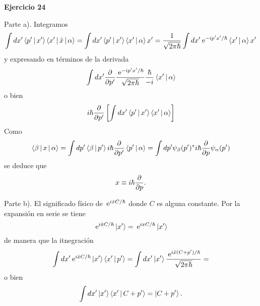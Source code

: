 \documentclass[10pt,oneside]{CBFT_book}
\begin{document}
\begin{ejemplo}{\bf Ejercicio 24}

Parte a). Integramos
\[
	\int dx' \Braket{p'|x'} \Braket{x'|\hat{x}|\alpha} = 
	\int dx' \Braket{p'|x'} \Braket{x'|\alpha} x' =
	\frac{1}{\sqrt{2\pi\hbar}} \int dx' \:\mathrm{e}^{-i p' x' /\hbar } \Braket{x'|\alpha} x'
\]
y expresando en términos de la derivada
\[
	 \int dx' \frac{\partial^{\hspace{-0.05em}} {}}{\partial {p'}^{\hspace{-0.05em}}}\frac{\:\mathrm{e}^{-i p' x' /\hbar }}{\sqrt{2\pi\hbar}} \frac{\hbar}{-i} \Braket{x'|\alpha}
\]
o bien
\[
	i \hbar \frac{\partial^{\hspace{-0.05em}} {}}{\partial {p'}^{\hspace{-0.05em}}} \left[ \int dx' \Braket{p'|x'} \Braket{x'|\alpha} \right]
\]
Como
\[
	\Braket{\beta|x|\alpha} = \int dp' \Braket{\beta|p'} i \hbar \frac{\partial^{\hspace{-0.05em}} {}}{\partial {p'}^{\hspace{-0.05em}}} \Braket{p'|\alpha} =
	\int dp' \psi_\beta(p')^* i \hbar \frac{\partial^{\hspace{-0.05em}} {}}{\partial {p}^{\hspace{-0.05em}}} \psi_\alpha(p')
\]
se deduce que
\[
	x \equiv i \hbar \frac{\partial^{\hspace{-0.05em}} {}}{\partial {p}^{\hspace{-0.05em}}}.
\]

Parte b). El significado físico de $\:\mathrm{e}^{i \hat{x} C / \hbar }$ donde $C$ es alguna constante.
Por la expansión en serie se tiene
\[
	\:\mathrm{e}^{i \hat{x} C / \hbar } \Ket{x'} = \:\mathrm{e}^{i {x} C / \hbar } \Ket{x'}
\]
de manera que la itnegración 
\[
	\int dx' \:\mathrm{e}^{i \hat{x} C / \hbar } \Ket{x'}\Braket{x'|p'} = 
	\int dx' \Ket{x'} \frac{ \:\mathrm{e}^{i \hat{x} ( C + p' )/ \hbar } }{\sqrt{2\pi\hbar}} =
\]
o bien
\[
	\int dx' \Ket{x'}\Braket{x'|C+p'} = \Ket{C+p'}.
\]

 
\end{ejemplo}






\end{document}

